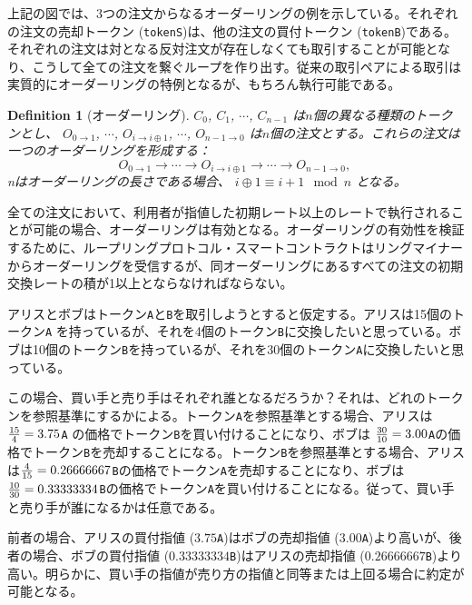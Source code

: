 \documentclass{article}
\newtheorem{definition}{Definition}[section]
\begin{document}
\begin{multicols}{2}
上記の図では、3つの注文からなるオーダーリングの例を示している。それぞれの注文の売却トークン (\verb|tokenS|)は、他の注文の買付トークン (\verb|tokenB|)である。それぞれの注文は対となる反対注文が存在しなくても取引することが可能となり、こうして全ての注文を繋ぐループを作り出す。従来の取引ペアによる取引は実質的にオーダーリングの特例となるが、もちろん執行可能である。


\begin{definition}[オーダーリング]$C_{0}$, $C_{1}$, $\cdots$, $C_{n-1}$ は$n$個の異なる種類のトークンとし、 $O_{0\rightarrow 1}$, $\cdots$, $O_{i\rightarrow i\oplus 1}$, $\cdots$, $O_{n-1 \rightarrow 0}$ は$n$個の注文とする。これらの注文は一つのオーダーリングを形成する：
$$O_{0\rightarrow 1} \rightarrow \cdots \rightarrow O_{i\rightarrow i\oplus 1} \rightarrow \cdots \rightarrow O_{n-1\rightarrow 0} \text{, }$$
nはオーダーリングの長さである場合、 $i\oplus 1 \equiv i+1 \mod n$ となる。
\end{definition}

全ての注文において、利用者が指値した初期レート以上のレートで執行されることが可能の場合、オーダーリングは有効となる。オーダーリングの有効性を検証するために、ループリングプロトコル・スマートコントラクトはリングマイナーからオーダーリングを受信するが、同オーダーリングにあるすべての注文の初期交換レートの積が1以上とならなければならない。

アリスとボブはトークン\verb|A|と\verb|B|を取引しようとすると仮定する。アリスは15個のトークン\verb|A| を持っているが、それを4個のトークン\verb|B|に交換したいと思っている。ボブは10個のトークン\verb|B|を持っているが、それを30個のトークン\verb|A|に交換したいと思っている。

この場合、買い手と売り手はそれぞれ誰となるだろうか？それは、どれのトークンを参照基準にするかによる。トークン\verb|A|を参照基準とする場合、アリスは ${15 \over 4} = 3.75$\verb|A| の価格でトークン\verb|B|を買い付けることになり、ボブは ${30 \over 10} = 3.00$\verb|A|の価格でトークン\verb|B|を売却することになる。トークン\verb|B|を参照基準とする場合、アリスは${4\over 15}=0.26666667$\verb|B|の価格でトークン\verb|A|を売却することになり、ボブは${10 \over 30}=0.33333334$\verb|B|の価格でトークン\verb|A|を買い付けることになる。従って、買い手と売り手が誰になるかは任意である。

前者の場合、アリスの買付指値 ($3.75$\verb|A|)はボブの売却指値 ($3.00$\verb|A|)より高いが、後者の場合、ボブの買付指値 ($0.33333334$\verb|B|)はアリスの売却指値 ($0.26666667$\verb|B|)より高い。明らかに、買い手の指値が売り方の指値と同等または上回る場合に約定が可能となる。


\end{multicols}
\end{document}
